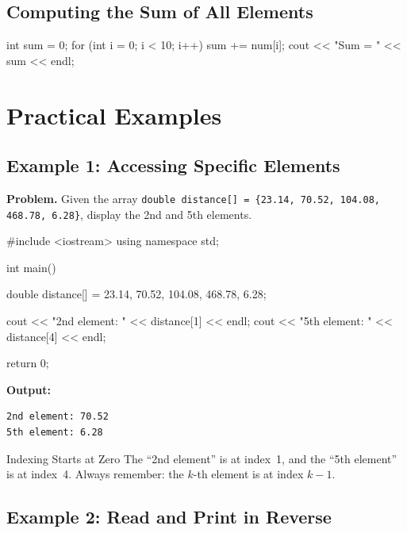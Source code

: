 \subsection{Computing the Sum of All Elements}

\begin{cppcode}
int sum = 0;
for (int i = 0; i < 10; i++) {
    sum += num[i];
}
cout << "Sum = " << sum << endl;
\end{cppcode}

\section{Practical Examples}
\label{sec:array-examples}

\subsection{Example 1: Accessing Specific Elements}

\textbf{Problem.} Given the array
\texttt{double distance[] = \{23.14, 70.52, 104.08, 468.78, 6.28\}},
display the 2nd and 5th elements.

\begin{cppcode}
#include <iostream>
using namespace std;

int main() {
    double distance[] = {23.14, 70.52, 104.08,
                         468.78, 6.28};

    cout << "2nd element: " << distance[1] << endl;
    cout << "5th element: " << distance[4] << endl;

    return 0;
}
\end{cppcode}

\textbf{Output:}
\begin{verbatim}
2nd element: 70.52
5th element: 6.28
\end{verbatim}

\begin{infobox}{Indexing Starts at Zero}
The ``2nd element'' is at index~1, and the ``5th element'' is at index~4.
Always remember: the $k$-th element is at index $k - 1$.
\end{infobox}

\subsection{Example 2: Read and Print in Reverse}

